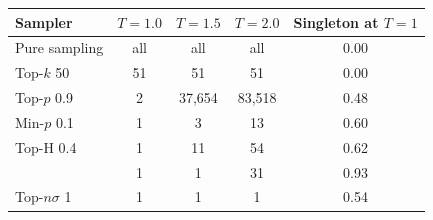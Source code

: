 \begin{tabular}{lcccc}
\toprule
Sampler & $T{=}1.0$ & $T{=}1.5$ & $T{=}2.0$ & Singleton at $T{=}1$ \\
\midrule
Pure sampling & all & all & all & 0.00 \\
Top-$k$ 50 & 51 & 51 & 51 & 0.00 \\
Top-$p$ 0.9 & 2 & 37,654 & 83,518 & 0.48 \\
Min-$p$ 0.1 & 1 & 3 & 13 & 0.60 \\
Top-H 0.4 & 1 & 11 & 54 & 0.62 \\
\pless{} & 1 & 1 & 31 & 0.93 \\
Top-$n\sigma$ 1 & 1 & 1 & 1 & 0.54 \\
\bottomrule
\end{tabular}
